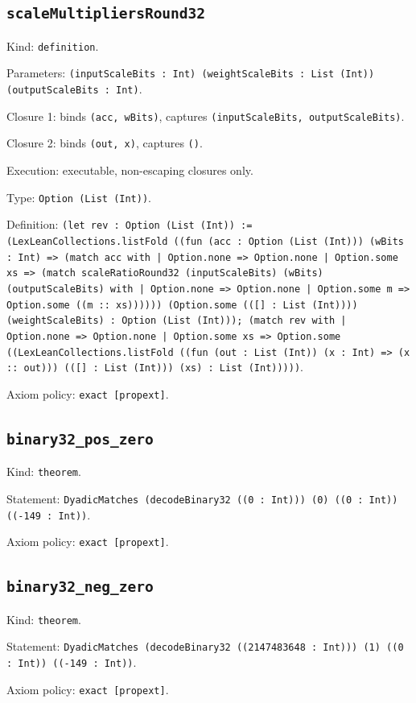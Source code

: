 \documentclass[11pt]{article}
\begin{document}
\subsection*{\texttt{scaleMultipliersRound32}}
\noindent Kind: \texttt{definition}.\par
\noindent Parameters: \texttt{(inputScaleBits : Int) (weightScaleBits : List (Int)) (outputScaleBits : Int)}.\par
\noindent Closure 1: binds \texttt{(acc, wBits)}, captures \texttt{(inputScaleBits, outputScaleBits)}.\par
\noindent Closure 2: binds \texttt{(out, x)}, captures \texttt{()}.\par
\noindent Execution: executable, non-escaping closures only.\par
\noindent Type: \texttt{Option (List (Int))}.\par
\noindent Definition: \texttt{(let rev : Option (List (Int)) := (LexLeanCollections.listFold ((fun (acc : Option (List (Int))) (wBits : Int) => (match acc with | Option.none => Option.none | Option.some xs => (match scaleRatioRound32 (inputScaleBits) (wBits) (outputScaleBits) with | Option.none => Option.none | Option.some m => Option.some ((m :: xs)))))) (Option.some (([] : List (Int)))) (weightScaleBits) : Option (List (Int))); (match rev with | Option.none => Option.none | Option.some xs => Option.some ((LexLeanCollections.listFold ((fun (out : List (Int)) (x : Int) => (x :: out))) (([] : List (Int))) (xs) : List (Int)))))}.\par
\noindent Axiom policy: \texttt{exact [propext]}.\par
\subsection*{\texttt{binary32\_pos\_zero}}
\noindent Kind: \texttt{theorem}.\par
\noindent Statement: \texttt{DyadicMatches (decodeBinary32 ((0 : Int))) (0) ((0 : Int)) ((-149 : Int))}.\par
\noindent Axiom policy: \texttt{exact [propext]}.\par
\subsection*{\texttt{binary32\_neg\_zero}}
\noindent Kind: \texttt{theorem}.\par
\noindent Statement: \texttt{DyadicMatches (decodeBinary32 ((2147483648 : Int))) (1) ((0 : Int)) ((-149 : Int))}.\par
\noindent Axiom policy: \texttt{exact [propext]}.\par
\end{document}
